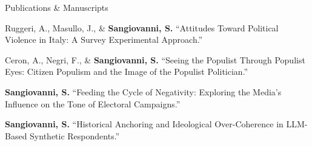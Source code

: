 \documentclass{cv}
\begin{document}
\begin{rSection}{Publications \& Manuscripts}
\subtitle{Selected Work in Progress}

\begin{pubEntry}

\begin{pubEntry}
Ruggeri, A., Masullo, J., \& \textbf{Sangiovanni, S.} \enquote{Attitudes Toward Political Violence in Italy: A Survey Experimental Approach.}
\end{pubEntry}

\begin{pubEntry}
Ceron, A., Negri, F., \& \textbf{Sangiovanni, S.} \enquote{Seeing the Populist Through Populist Eyes: Citizen Populism and the Image of the Populist Politician.}
\end{pubEntry}

\begin{pubEntry}
\textbf{Sangiovanni, S.} \enquote{Feeding the Cycle of Negativity: Exploring the Media's Influence on the Tone of Electoral Campaigns.}
\end{pubEntry}

\textbf{Sangiovanni, S.} \enquote{Historical Anchoring and Ideological Over-Coherence in LLM-Based Synthetic Respondents.}
\end{pubEntry}

\end{rSection}
\newpage
\end{document}
